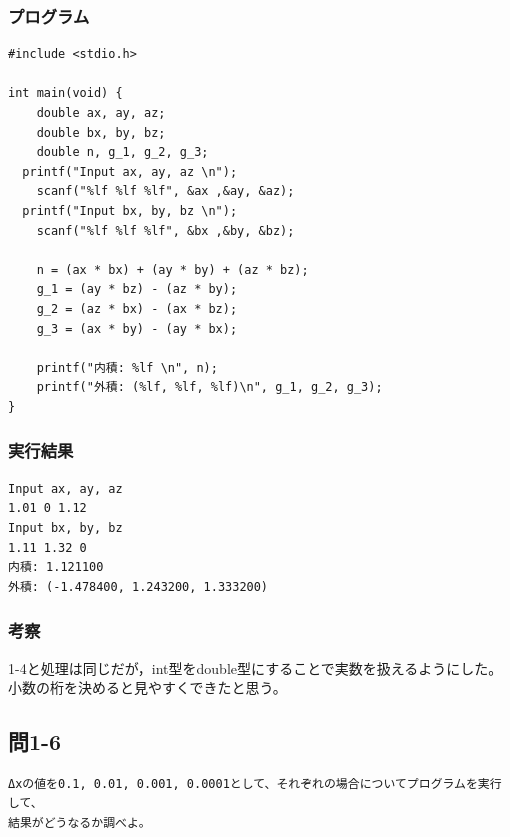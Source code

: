 \documentclass{jarticle}
\begin{document}
\subsubsection{プログラム\\}
\begin{breakbox}
\begin{verbatim}
#include <stdio.h>

int main(void) {
	double ax, ay, az;
	double bx, by, bz;
	double n, g_1, g_2, g_3;
  printf("Input ax, ay, az \n");
	scanf("%lf %lf %lf", &ax ,&ay, &az);
  printf("Input bx, by, bz \n");
	scanf("%lf %lf %lf", &bx ,&by, &bz);
  
	n = (ax * bx) + (ay * by) + (az * bz); 
	g_1 = (ay * bz) - (az * by); 
	g_2 = (az * bx) - (ax * bz); 
	g_3 = (ax * by) - (ay * bx);

	printf("内積: %lf \n", n);
	printf("外積: (%lf, %lf, %lf)\n", g_1, g_2, g_3); 
}
\end{verbatim}
\end{breakbox}
\subsubsection{実行結果\\}
\begin{breakbox}
\begin{verbatim}
Input ax, ay, az 
1.01 0 1.12
Input bx, by, bz 
1.11 1.32 0
内積: 1.121100 
外積: (-1.478400, 1.243200, 1.333200)
\end{verbatim}
\end{breakbox}
\subsubsection{考察\\}
1-4と処理は同じだが，int型をdouble型にすることで実数を扱えるようにした。\\
小数の桁を決めると見やすくできたと思う。\\

\subsection{問1-6\\}
\begin{verbatim}
Δxの値を0.1, 0.01, 0.001, 0.0001として、それぞれの場合についてプログラムを実行して、
結果がどうなるか調べよ。
\end{verbatim}
\end{document}
